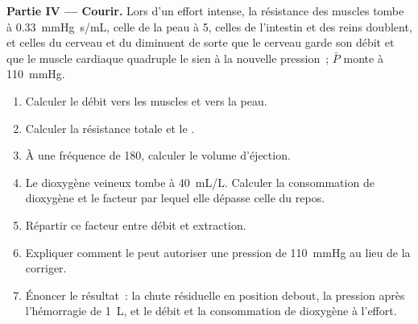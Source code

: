\begin{problem}
\medskip
\noindent\textbf{Partie IV --- Courir.}
Lors d'un effort intense, la résistance des muscles tombe à
\qty{0.33}{mmHg.s/mL}, celle de la peau à 5, celles de l'intestin et des
reins doublent, et celles du cerveau et du  diminuent de sorte que
le cerveau garde son débit et que le muscle cardiaque quadruple le sien
à la nouvelle pression~; $\bar P$ monte à \qty{110}{mmHg}.
\begin{enumerate}[resume]
  \item Calculer le débit vers les muscles et vers la peau.
  \item Calculer la résistance totale et le .
  \item À une fréquence de 180, calculer le volume d'éjection.
  \item Le dioxygène veineux tombe à \qty{40}{mL/L}. Calculer la
        consommation de dioxygène et le facteur par lequel elle dépasse
        celle du repos.
  \item Répartir ce facteur entre débit et extraction.
  \item Expliquer comment le  peut autoriser une pression de
        \qty{110}{mmHg} au lieu de la corriger.
  \item Énoncer le résultat~: la chute résiduelle en position debout, la
        pression après l'hémorragie de \qty{1}{L}, et le débit et la
        consommation de dioxygène à l'effort.
\end{enumerate}
\end{problem}
